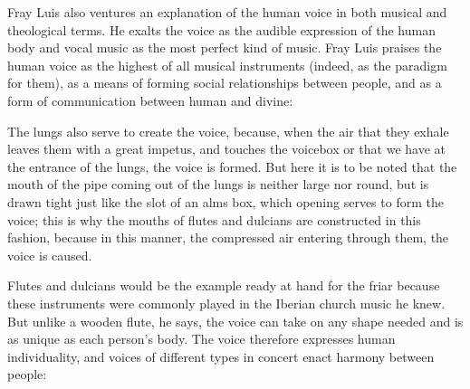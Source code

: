 Fray Luis also ventures an explanation of the human voice in both musical and
theological terms.
He exalts the voice as the audible expression of the human body and
vocal music as the most perfect kind of music.%
    \Autocite[243]{LuisdeGranada:Simbolo} 
Fray Luis praises the human voice as the highest of all musical instruments
(indeed, as the paradigm for them), as a means of forming social relationships
between people, and as a form of communication between human and divine:
\begin{quoting} 
    The lungs also serve to create the voice, because, when the air that they
    exhale leaves them with a great impetus, and touches the voicebox or
     that we have at the entrance of the lungs, the voice
    is formed. \Dots{}
    But here it is to be noted that the mouth of the pipe coming out of the
    lungs is neither large nor round, but is drawn tight  just like
    the slot of an alms box,
    which opening serves to form the voice; this is why the mouths of flutes
    and dulcians are constructed in this fashion, because in this manner, the
    compressed air entering through them, the voice is caused.%
    \Autocite[252]{LuisdeGranada:Simbolo} 
\end{quoting}
Flutes and dulcians would be the example ready at hand for the friar because
these instruments were commonly played in the Iberian church music he knew.
But unlike a wooden flute, he says, the voice can take on any shape needed and
is as unique as each person's body.
The voice therefore expresses human individuality, and voices of different
types in concert enact harmony between people: 
